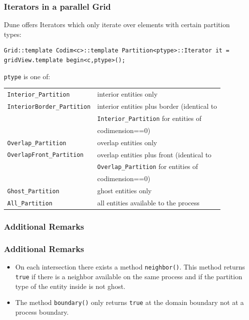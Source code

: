 \begin{frame}[fragile]
  \frametitle<presentation>{Iterators in a parallel Grid}
  \small
  Dune offers Iterators which only iterate over elements with certain partition types:\\
\begin{lstlisting}
Grid::template Codim<c>::template Partition<ptype>::Iterator it = gridView.template begin<c,ptype>();
\end{lstlisting}

\lstinline!ptype! is one of:
  \begin{center}
    \begin{tabular}{ll}
      \texttt{Interior\_Partition} & interior entities only\\
      \texttt{InteriorBorder\_Partition} & interior entities plus border (identical to \\
                                         & \texttt{Interior\_Partition} for entities of \\
                                         & codimension==0)\\
      \texttt{Overlap\_Partition} & overlap entities only\\
      \texttt{OverlapFront\_Partition} & overlap entities plus front (identical to \\
                                       & \texttt{Overlap\_Partition} for entities of \\
                                       & codimension==0)\\
      \texttt{Ghost\_Partition} & ghost entities only\\
      \texttt{All\_Partition} & all entities available to the process
    \end{tabular}
  \end{center}
\end{frame}

\subsubsection{Additional Remarks}

\begin{frame}
\frametitle<presentation>{Additional Remarks}
\begin{itemize}
\item On each intersection there exists a method \lstinline!neighbor()!. This method returns \lstinline!true! if there is a 
neighbor available on the same process and if the partition type of the entity inside is not ghost.
\item The method \lstinline!boundary()! only returns \lstinline!true! at the domain boundary not at a process boundary.
\end{itemize}
\end{frame}

